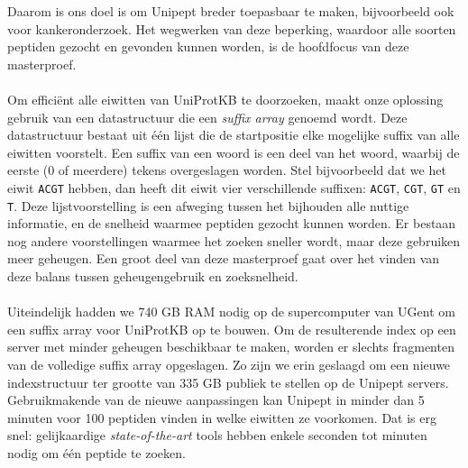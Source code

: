 Daarom is ons doel is om Unipept breder toepasbaar te maken, bijvoorbeeld ook voor kankeronderzoek.
Het wegwerken van deze beperking, waardoor alle soorten peptiden gezocht en gevonden kunnen worden, is de hoofdfocus van deze masterproef.
\\ \\
Om efficiënt alle eiwitten van UniProtKB te doorzoeken, maakt onze oplossing gebruik van een datastructuur die een \textit{suffix array} genoemd wordt.
Deze datastructuur bestaat uit één lijst die de startpositie elke mogelijke suffix van alle eiwitten voorstelt.
Een suffix van een woord is een deel van het woord, waarbij de eerste (0 of meerdere) tekens overgeslagen worden.
Stel bijvoorbeeld dat we het eiwit \texttt{ACGT} hebben, dan heeft dit eiwit vier verschillende suffixen:
\texttt{ACGT}, \texttt{CGT}, \texttt{GT} en \texttt{T}.
Deze lijstvoorstelling is een afweging tussen het bijhouden alle nuttige informatie, en de snelheid waarmee peptiden gezocht kunnen worden.
Er bestaan nog andere voorstellingen waarmee het zoeken sneller wordt, maar deze gebruiken meer geheugen.
Een groot deel van deze masterproef gaat over het vinden van deze balans tussen geheugengebruik en zoeksnelheid.
\\ \\
Uiteindelijk hadden we 740 GB RAM nodig op de supercomputer van UGent om een suffix array voor UniProtKB op te bouwen.
Om de resulterende index op een server met minder geheugen beschikbaar te maken, worden er slechts fragmenten van de volledige suffix array opgeslagen.
Zo zijn we erin geslaagd om een nieuwe indexstructuur ter grootte van 335 GB publiek te stellen op de Unipept servers.
Gebruikmakende van de nieuwe aanpassingen kan Unipept in minder dan 5 minuten voor 100 peptiden vinden in welke eiwitten ze voorkomen.
Dat is erg snel: gelijkaardige \textit{state-of-the-art} tools hebben enkele seconden tot minuten nodig om één peptide te zoeken.
\afterpage{\blankpage}